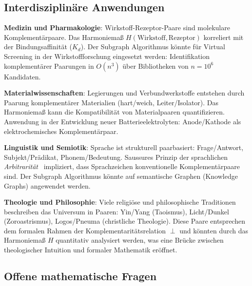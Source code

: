 ﻿\documentclass[a4paper,12pt]{article}
\theoremstyle{definition}
\begin{document}
\subsection{Interdisziplinäre Anwendungen}

\textbf{Medizin und Pharmakologie}: Wirkstoff-Rezeptor-Paare sind molekulare
Komplementärpaare. Das Harmoniemaß $H(\text{Wirkstoff}, \text{Rezeptor})$
korreliert mit der Bindungsaffinität ($K_d$). Der Subgraph Algorithmus könnte
für Virtual Screening in der Wirkstoffforschung eingesetzt werden: Identifikation
komplementärer Paarungen in $O(n^3)$ über Bibliotheken von $n = 10^6$ Kandidaten.

\textbf{Materialwissenschaften}: Legierungen und Verbundwerkstoffe entstehen
durch Paarung komplementärer Materialien (hart/weich, Leiter/Isolator).
Das Harmoniemaß kann die Kompatibilität von Materialpaaren quantifizieren.
Anwendung in der Entwicklung neuer Batterieelektrolyten: Anode/Kathode als
elektrochemisches Komplementärpaar.

\textbf{Linguistik und Semiotik}: Sprache ist strukturell paarbasiert:
Frage/Antwort, Subjekt/Prädikat, Phonem/Bedeutung. Saussures Prinzip der
sprachlichen \emph{Arbitrarität}~\cite{weyl1952} impliziert, dass Sprachzeichen
konventionelle Komplementärpaare sind. Der Subgraph Algorithmus könnte auf
semantische Graphen (Knowledge Graphs) angewendet werden.

\textbf{Theologie und Philosophie}: Viele religiöse und philosophische Traditionen
beschreiben das Universum in Paaren: Yin/Yang (Taoismus), Licht/Dunkel (Zoroastrismus),
Logos/Pneuma (christliche Theologie). Diese Paare entsprechen dem formalen Rahmen
der Komplementaritätsrelation $\perp$ und könnten durch das Harmoniemaß $H$
quantitativ analysiert werden, was eine Brücke zwischen theologischer Intuition
und formaler Mathematik eröffnet.

\subsection{Offene mathematische Fragen}
\end{document}
